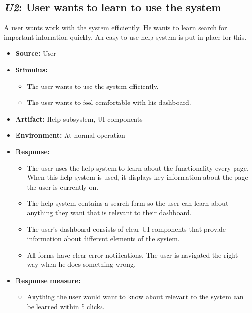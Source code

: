 \subsection{\emph{U2}: User wants to learn to use the system}
A user wants work with the system efficiently. He wants to learn search for
important infomation quickly. An easy to use help system is put in place
for this.

\begin{itemize}
    \item \textbf{Source:} User
    \item \textbf{Stimulus:}
        \begin{itemize}
            \item The user wants to use the system efficiently.
            \item The user wants to feel comfortable with his dashboard.
        \end{itemize}

    \item \textbf{Artifact:} Help subsystem, UI components
    \item \textbf{Environment:} At normal operation
    \item \textbf{Response:}
        \begin{itemize}
            \item The user uses the help system to learn about the functionality
                  every page. When this help system is used, it displays
                  key information about the page the user is currently
                  on. 
            \item The help system contains a search form so the user can learn about
                  anything they want that is relevant to their dashboard.
            \item The user's dashboard consists of clear UI
                  components that provide information about different elements of the system.
            \item All forms have clear error notifications. The user is navigated the right way
                  when he does something wrong.
        \end{itemize}

    \item \textbf{Response measure:}
        \begin{itemize}
            \item Anything the user would want to know about relevant to the system
                  can be learned within 5 clicks.
        \end{itemize}
\end{itemize}
